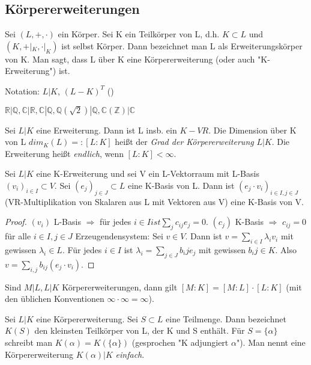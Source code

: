 \documentclass[../main.tex]{subfiles}
\begin{document}
\subsection{Körpererweiterungen}
\begin{definition}[Körpererweiterung]
    Sei $(L, +, \cdot)$ ein Körper. Sei K ein Teilkörper von L, d.h. $K \subset L$ und $(K,+|_K,\cdot|_K)$ ist selbst Körper. Dann bezeichnet man L als Erweiterungskörper von K. Man sagt, dass L über K eine Körpererweiterung (oder auch "K-Erweiterung") ist. 

    Notation: $L | K$, $(L - K)^T$ ()
\end{definition}
\begin{example*} $\mathbb{R}|\mathbb{Q}, \mathbb{C}|\mathbb{R},\mathbb{C}|\mathbb{Q},\mathbb{Q}(\sqrt{2}) | \mathbb{Q}, \mathbb{C}(\mathbb{Z}) | \mathbb{C}$ \end{example*}
\begin{definition}
    Sei $L | K$ eine Erweiterung. Dann ist L insb. ein $K-VR$. Die Dimension über K von L $dim_K(L) =: [L:K]$ heißt der \emph{Grad der Körpererweiterung} $L | K$. Die Erweiterung heißt \emph{endlich}, wenn $[L:K] < \infty$.
\end{definition}
\begin{lemma}
    Sei $L | K$ eine K-Erweiterung und sei V ein L-Vektorraum mit L-Basis $(v_i)_{i \in I} \subset V$. Sei $(e_j)_{j \in J} \subset L$ eine K-Basis von L. Dann ist $(e_j \cdot v_i)_{i \in I, j \in J}$ (VR-Multiplikation von Skalaren aus L mit Vektoren aus V) eine K-Basis von V.
\end{lemma}
\begin{proof}
$(v_i)$ L-Basis $\Rightarrow$ für jedes $i \in I ist \sum_j c_{ij}e_j = 0$. $(c_j)$ K-Basis $\Rightarrow$ $c_{ij} = 0$ für alle $i \in I, j \in J$
Erzeugendensystem: Sei $v \in V$.
Dann ist $v = \sum_{i \in I} \lambda_iv_i$ mit gewissen $\lambda_i \in L$. Für jedes $i \in I$ ist $\lambda_i = \sum_{j \in J} b_ije_j$ mit gewissen $b_ij \in K$. Also $v = \sum_{i,j} b_{ij}(e_j \cdot v_i)$.
\end{proof}
\begin{lemma}[Korollar] \label{theo:2.12}
    Sind $M | L, L | K$ Körpererweiterungen, dann gilt $[M:K] = [M:L]\cdot[L:K]$ (mit den üblichen Konventionen $\infty \cdot \infty = \infty$).
\end{lemma}
\begin{definition}[Adjungieren]
    Sei $L | K$ eine Körpererweiterung. Sei $S \subset L$ eine Teilmenge. Dann bezeichnet $K(S)$ den kleinsten Teilkörper von L, der K und S enthält. Für $S=\{\alpha\}$ schreibt man $K(\alpha) = K(\{\alpha\})$ (gesprochen "K adjungiert $\alpha$"). Man nennt eine Körpererweiterung $K(\alpha) | K$ \emph{einfach}.
\end{definition}
\end{document}
